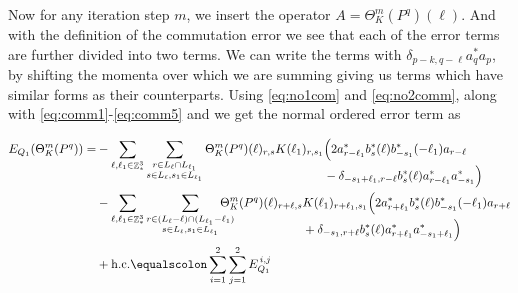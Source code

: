 \documentclass[sn-mathphys, Numbered ,a4paper]{sn-jnl}%
\DeclareMathOperator{\Z}{\mathbb{Z}}
\theoremstyle{plain}
\theoremstyle{definition}
\theoremstyle{remark}
\theoremstyle{plain}
\theoremstyle{definition}
\theoremstyle{remark}
\begin{document}
Now for any iteration step $m$, we insert the operator $A= \Theta^m_K(P^q)(\ell)$. And with the definition of the commutation error we see that each of the error terms are further divided into two terms. We can write the terms with $\delta_{p-k,q-\ell}a^*_{q}a_{p}$, by shifting the momenta over which we are summing giving us terms which have similar forms as their counterparts. Using \eqref{eq:no1com} and \eqref{eq:no2comm}, along with \eqref{eq:comm1}-\eqref{eq:comm5} and we get the normal ordered error term as
\begin{comment}
\begin{alignat}{2}
	E_{Q_1}(A) &= -
	\sum\limits_{\ell, \ell_1\in \Z^3_*}\sum\limits_{\substack{r\in L_{\ell} \cap L_{\ell_1}\\ s \in L_{\ell},s_1\in L_{\ell_1}}} A(\ell)_{r,s}K(\ell_1)_{r,s_1}
	\begin{aligned}[t]
		&\Big( 2a^*_{r-\ell_1}b^*_{s}(\ell) b^*_{-s_1}(-\ell_1)a_{r-\ell} \\ &+ b^*_{s}(\ell) a^*_{r-\ell_1}[b_{-s_1}(-\ell_1),a^*_{r-\ell}]^*+ \mathrm{h.c.} \Big)
	\end{aligned}\nonumber\\
	&\quad -\sum\limits_{\ell, \ell_1\in \Z^3_*}\sum\limits_{\substack{r\in (L_{\ell}-\ell) \cap (L_{\ell_1}-\ell_1)\\ s \in L_{\ell},s_1\in L_{\ell_1} }}\!\!\!\!\!\!\!\!\!\begin{aligned}[t] A(\ell)_{r+\ell,s}&K(\ell_1)_{r+\ell_1,s_1}
		\Big( 2a^*_{r+\ell_1}b^*_{s}(\ell) b^*_{-s_1}(-\ell_1) a_{r+\ell}\nonumber \\ &+ b^*_{s}(\ell) a^*_{r+\ell_1}[b_{-s_1}(-\ell_1),a^*_{r+\ell}]^*+ \mathrm{h.c.} \Big)
	\end{aligned}\\
\end{alignat}
\end{comment}
\begin{alignat}{2}
	E_{Q_1}(\Theta^m_{K}(P^q)) = &-
	\sum\limits_{\ell, \ell_1\in \Z^3_*}\sum\limits_{\substack{r\in L_{\ell} \cap L_{\ell_1}\\ s \in L_{\ell},s_1\in L_{\ell_1}}} \Theta^m_{K}(P^q)(\ell)_{r,s}K(\ell_1)_{r,s_1}
	\begin{aligned}[t]
		&\Big( 2a^*_{r-\ell_1}b^*_{s}(\ell) b^*_{-s_1}(-\ell_1)a_{r-\ell} \\ & -\delta_{-s_1+\ell_1,r-\ell} b^*_{s}(\ell) a^*_{r-\ell_1}a^*_{-s_1}\Big)
	\end{aligned}\nonumber\\
	& -\sum\limits_{\ell, \ell_1\in \Z^3_*}\sum\limits_{\substack{r\in (L_{\ell}-\ell) \cap (L_{\ell_1}-\ell_1)\\ s \in L_{\ell},s_1\in L_{\ell_1} }}\!\!\!\!\!\!\!\!\!
	\begin{aligned}[t] \Theta^m_{K}(P^q)(\ell)_{r+\ell,s}&K(\ell_1)_{r+\ell_1,s_1}
		\Big( 2a^*_{r+\ell_1}b^*_{s}(\ell) b^*_{-s_1}(-\ell_1) a_{r+\ell}\nonumber \\ &+ \delta_{-s_1,r+\ell} b^*_{s}(\ell) a^*_{r+\ell_1}a^*_{-s_1+\ell_1}\Big)
	\end{aligned}\\
	&+ \mathrm{h.c.} \equalscolon \sum\limits_{i=1}^{2}\sum\limits_{j=1}^{2} E_{Q_1}^{\,i,j}\nonumber
\end{alignat}
\end{document}
